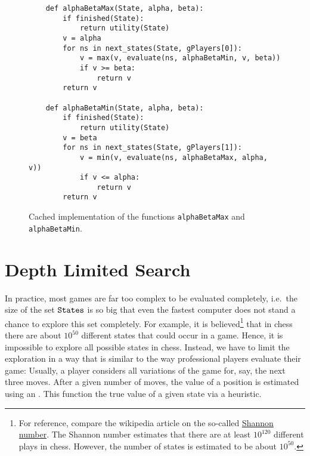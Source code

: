 \begin{figure}[!ht]
\centering
\begin{verbatim}
    def alphaBetaMax(State, alpha, beta):
        if finished(State):
            return utility(State)
        v = alpha
        for ns in next_states(State, gPlayers[0]):
            v = max(v, evaluate(ns, alphaBetaMin, v, beta))
            if v >= beta:
                return v
        return v
    
    def alphaBetaMin(State, alpha, beta):
        if finished(State):
            return utility(State)
        v = beta
        for ns in next_states(State, gPlayers[1]):
            v = min(v, evaluate(ns, alphaBetaMax, alpha, v))
            if v <= alpha:
                return v
        return v
\end{verbatim}
\vspace*{-0.3cm}
\caption{Cached implementation of the functions \texttt{alphaBetaMax} and \texttt{alphaBetaMin}.}
\label{fig:alphaBetaCached}
\end{figure}
\FloatBarrier

\section{Depth Limited Search}
In practice, most games are far too complex to be evaluated completely, i.e.~the size of the set
$\texttt{States}$ is so big that even the fastest computer does not stand a chance to explore this set
completely.  For example, it is believed\footnote{
  For reference, compare the wikipedia article on the so-called
  \href{https://en.wikipedia.org/wiki/Shannon_number}{Shannon number}.
  The Shannon number estimates that there are at least $10^{120}$ different plays in chess.  However, the
  number of states is estimated to be about $10^{50}$. 
}
that in chess there are about $10^{50}$ different states that could occur in a game.
Hence, it is impossible to explore all possible states in chess.  Instead, we have to limit
the exploration in a way that is similar to the way professional players evaluate their game:  Usually, a
player considers all variations of the game for, say, the next three moves.  After a given number of moves, the
value of a position is estimated using an .  This function  the true
value of a given state via a heuristic.

